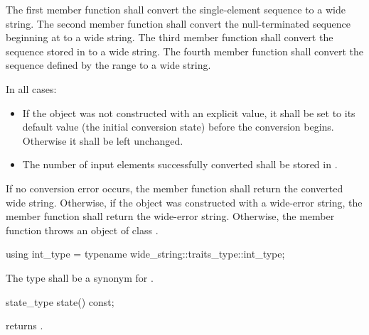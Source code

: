 \begin{itemdescr}
\pnum
\effects
The first member function shall convert the single-element sequence  to a
wide string. The second member function shall convert the null-terminated
sequence beginning at  to a wide string. The third member function
shall convert the sequence stored in  to a wide string. The fourth member
function shall convert the sequence defined by the range  to a
wide string.

\pnum
In all cases:

\begin{itemize}
\item If the  object was not constructed with an explicit value, it
shall be set to its default value (the initial conversion state) before the
conversion begins. Otherwise it shall be left unchanged.

\item The number of input elements successfully converted shall be stored in .
\end{itemize}

\pnum
\returns
If no conversion error occurs, the member function shall return the converted wide string.
Otherwise, if the object was constructed with a wide-error string, the
member function shall return the wide-error string.
Otherwise, the member function throws an object of class .
\end{itemdescr}

%
%
\begin{itemdecl}
using int_type = typename wide_string::traits_type::int_type;
\end{itemdecl}

\begin{itemdescr}
The type shall be a synonym for .
\end{itemdescr}

%
%
\begin{itemdecl}
state_type state() const;
\end{itemdecl}

\begin{itemdescr}
\pnum
returns .
\end{itemdescr}

